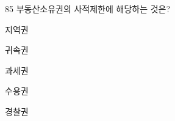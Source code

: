 \begin{question}{85}
부동산소유권의 사적제한에 해당하는 것은?
\begin{choices}
  \item 지역권
  \item 귀속권
  \item 과세권
  \item 수용권
  \item 경찰권
\end{choices}
\end{question}

